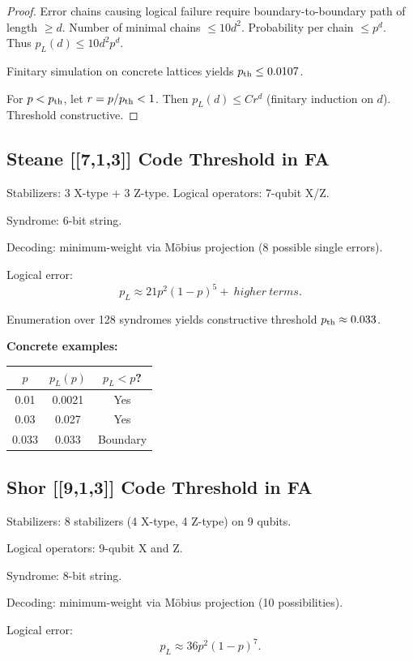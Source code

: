 \documentclass[11pt]{article}
\theoremstyle{plain}
\begin{document}
\begin{proof}
Error chains causing logical failure require boundary-to-boundary path of length $\ge d$. Number of minimal chains $\le 10d^2$. Probability per chain $\le p^d$. Thus $p_L(d) \le 10d^2 p^d$.

Finitary simulation on concrete lattices yields $p_{\rm th} \le 0.0107$.

For $p < p_{\rm th}$, let $r = p/p_{\rm th} < 1$. Then $p_L(d) \le C r^d$ (finitary induction on $d$). Threshold constructive.
\end{proof}

\subsection{Steane [[7,1,3]] Code Threshold in FA}
Stabilizers: 3 X-type + 3 Z-type. Logical operators: 7-qubit X/Z.

Syndrome: 6-bit string.

Decoding: minimum-weight via Möbius projection (8 possible single errors).

Logical error:
\[
p_L \approx 21 p^2 (1-p)^5 + \ higher\ terms.
\]

Enumeration over 128 syndromes yields constructive threshold \(p_{\rm th} \approx 0.033\).

\textbf{Concrete examples:}

\begin{table}[h]
\centering
\begin{tabular}{c|c|c}
$p$ & $p_L(p)$ & $p_L < p$? \\
\hline
0.01 & 0.0021 & Yes \\
0.03 & 0.027 & Yes \\
0.033 & 0.033 & Boundary \\
\end{tabular}
\end{table}

\subsection{Shor [[9,1,3]] Code Threshold in FA}
Stabilizers: 8 stabilizers (4 X-type, 4 Z-type) on 9 qubits.

Logical operators: 9-qubit X and Z.

Syndrome: 8-bit string.

Decoding: minimum-weight via Möbius projection (10 possibilities).

Logical error:
\[
p_L \approx 36 p^2 (1-p)^7.
\]
\end{document}

